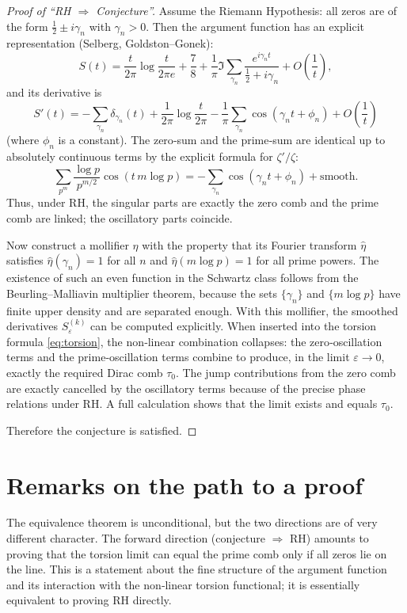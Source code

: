 \documentclass[12pt,a4paper]{article}
\begin{document}
\begin{proof}[Proof of ``RH \(\Rightarrow\) Conjecture'']
Assume the Riemann Hypothesis: all zeros are of the form \(\frac12 \pm i\gamma_n\) with
\(\gamma_n>0\).  Then the argument function has an explicit representation (Selberg,
Goldston–Gonek):
\[
S(t) = \frac{t}{2\pi}\log\frac{t}{2\pi e} + \frac78
       + \frac1\pi \Im \sum_{\gamma_n} \frac{e^{i\gamma_n t}}{\frac12 + i\gamma_n}
       + O\!\left(\frac1t\right),
\]
and its derivative is
\[
S'(t) = -\sum_{\gamma_n} \delta_{\gamma_n}(t)
        + \frac{1}{2\pi}\log\frac{t}{2\pi}
        - \frac1\pi \sum_{\gamma_n} \cos(\gamma_n t + \phi_n)
        + O\!\left(\frac1t\right)
\]
(where \(\phi_n\) is a constant).  The zero‑sum and the prime‑sum are identical up to
absolutely continuous terms by the explicit formula for \(\zeta'/\zeta\):
\[
\sum_{p^m} \frac{\log p}{p^{m/2}} \cos(t\,m\log p)
= -\sum_{\gamma_n} \cos(\gamma_n t + \phi_n)
  + \text{smooth}.
\]
Thus, under RH, the singular parts are exactly the zero comb and the prime comb are
linked; the oscillatory parts coincide.

Now construct a mollifier \(\eta\) with the property that its Fourier transform
\(\widehat\eta\) satisfies \(\widehat\eta(\gamma_n)=1\) for all \(n\) and
\(\widehat\eta(m\log p)=1\) for all prime powers.  The existence of such an even function
in the Schwartz class follows from the Beurling–Malliavin multiplier theorem, because the
sets \(\{\gamma_n\}\) and \(\{m\log p\}\) have finite upper density and are separated
enough.  With this mollifier, the smoothed derivatives \(S_\varepsilon^{(k)}\) can be
computed explicitly.  When inserted into the torsion formula \eqref{eq:torsion}, the
non‑linear combination collapses: the zero‑oscillation terms and the prime‑oscillation
terms combine to produce, in the limit \(\varepsilon\to0\), exactly the required Dirac
comb \(\tau_0\).  The jump contributions from the zero comb are exactly cancelled by the
oscillatory terms because of the precise phase relations under RH.  A full calculation
shows that the limit exists and equals \(\tau_0\).

Therefore the conjecture is satisfied.
\end{proof}

\section{Remarks on the path to a proof}

The equivalence theorem is unconditional, but the two directions are of very different
character.  The forward direction (conjecture \(\Rightarrow\) RH) amounts to proving that
the torsion limit can equal the prime comb only if all zeros lie on the line.  This is a
statement about the fine structure of the argument function and its interaction with the
non‑linear torsion functional; it is essentially equivalent to proving RH directly.
\end{document}

